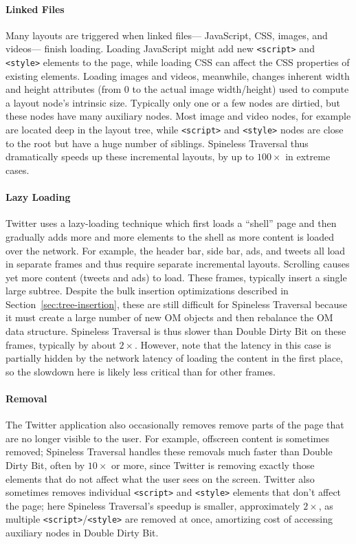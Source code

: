 \paragraph{Linked Files}
Many layouts are triggered when linked files---%
  JavaScript, CSS, images, and videos---%
  finish loading.
Loading JavaScript might add
  new \texttt{<script>} and \texttt{<style>} elements to the page,
  while loading CSS can affect the CSS properties
  of existing elements.
Loading images and videos, meanwhile,
  changes inherent width and height attributes
  (from 0 to the actual image width/height)
  used to compute a layout node's intrinsic size.
Typically only one or a few nodes are dirtied,
  but these nodes have many auxiliary nodes.
Most image and video nodes, for example
  are located deep in the layout tree,
  while \texttt{<script>} and \texttt{<style>} nodes
  are close to the root but have a huge number of siblings.
Spineless Traversal thus dramatically speeds up
  these incremental layouts,
  by up to $100\times$ in extreme cases.
 
\paragraph{Lazy Loading}
Twitter uses a lazy-loading technique
  which first loads a ``shell'' page
  and then gradually adds more and more elements to the shell
  as more content is loaded over the network.
For example, the header bar, side bar, ads, and tweets
  all load in separate frames and thus require
  separate incremental layouts.
Scrolling causes yet more content (tweets and ads) to load.
These frames, typically insert a single large subtree.
Despite the bulk insertion optimizations
  described in Section~\ref{sec:tree-insertion},
  these are still difficult for Spineless Traversal
  because it must create a large number of new OM objects
  and then rebalance the OM data structure.
Spineless Traversal is thus slower than Double Dirty Bit on these frames,
  typically by about $2\times$.
However, note that the latency in this case is partially hidden
  by the network latency of loading the content in the first place,
  so the slowdown here is likely less critical than for other frames.

\paragraph{Removal}
The Twitter application also occasionally removes
  remove parts of the page that are no longer visible to the user.
For example, offscreen content is sometimes removed;
  Spineless Traversal handles these removals
  much faster than Double Dirty Bit,
  often by $10\times$ or more,
  since Twitter is removing exactly those elements
  that do not affect what the user sees on the screen.
Twitter also sometimes removes
  individual \texttt{<script>} and \texttt{<style>} elements
  that don't affect the page;
  here Spineless Traversal's speedup
  is smaller, approximately $2\times$,
  as multiple \texttt{<script>}/\texttt{<style>} are removed at once,
  amortizing cost of accessing auxiliary nodes in Double Dirty Bit. 

